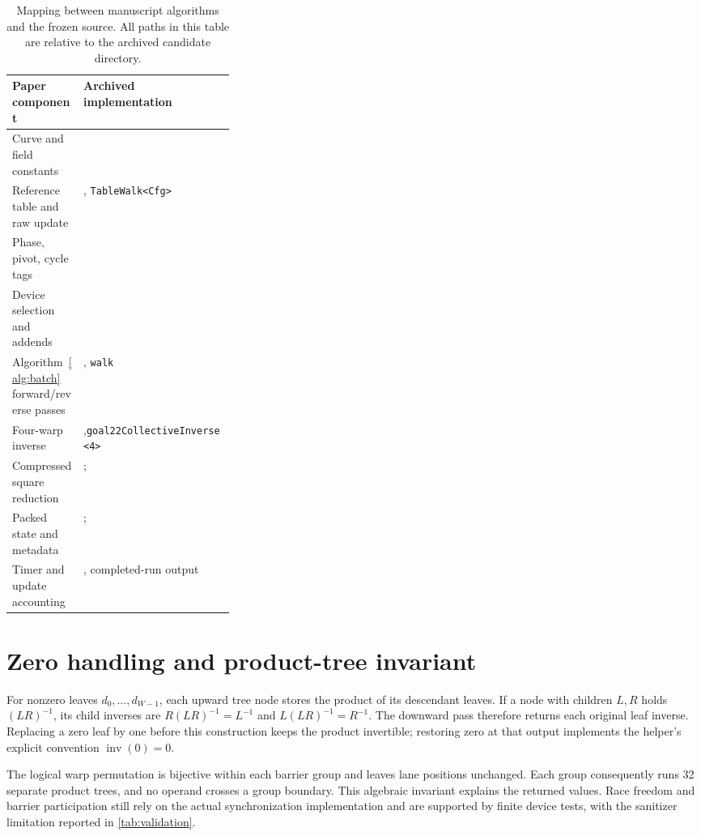 \documentclass[11pt,a4paper]{article}
\newcommand{\code}[1]{\texttt{\small #1}}
\begin{document}
\begin{table}[H]
\centering\small
\begin{tabularx}{\linewidth}{@{}>{\raggedright\arraybackslash}p{0.32\linewidth}Y@{}}
\toprule
Paper component & Archived implementation\\
\midrule
Curve and field constants & \\
Reference table and raw update & , \code{TableWalk<Cfg>}\\
Phase, pivot, cycle tags & \\
Device selection and addends & \\
Algorithm~\ref{alg:batch} forward/reverse passes & , \code{walk}\\
Four-warp inverse & ,\newline \code{goal22CollectiveInverse<4>}\\
Compressed square reduction & ; \\
Packed state and metadata & ; \\
Timer and update accounting & , completed-run output\\
\bottomrule
\end{tabularx}
\caption{Mapping between manuscript algorithms and the frozen source. All paths in this table are relative to the archived candidate directory.}
\end{table}

\section{Zero handling and product-tree invariant}
For nonzero leaves $d_0,\ldots,d_{W-1}$, each upward tree node stores the product of its descendant leaves. If a node with children $L,R$ holds $(LR)^{-1}$, its child inverses are $R(LR)^{-1}=L^{-1}$ and $L(LR)^{-1}=R^{-1}$. The downward pass therefore returns each original leaf inverse. Replacing a zero leaf by one before this construction keeps the product invertible; restoring zero at that output implements the helper's explicit convention $\operatorname{inv}(0)=0$.

The logical warp permutation is bijective within each barrier group and leaves lane positions unchanged. Each group consequently runs 32 separate product trees, and no operand crosses a group boundary. This algebraic invariant explains the returned values. Race freedom and barrier participation still rely on the actual synchronization implementation and are supported by finite device tests, with the sanitizer limitation reported in \cref{tab:validation}.
\end{document}
